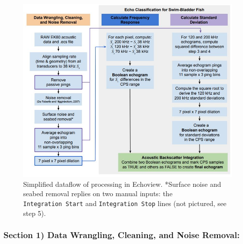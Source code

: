 \documentclass[
  letterpaper,
  oneside,
  open=any]{scrbook}
\begin{document}
\begin{figure}[H]

{\centering \includegraphics{content/images/ev-processing.JPG}

}

\caption{Simplified dataflow of processing in Echoview. *Surface noise
and seabed removal replies on two manual inputs: the
\texttt{Integration\ Start} and \texttt{Integration\ Stop} lines (not
pictured, see step 5).}

\end{figure}%

\subsubsection{\texorpdfstring{\textbf{Section 1) Data Wrangling,
Cleaning, and Noise
Removal:}}{Section 1) Data Wrangling, Cleaning, and Noise Removal:}}\label{section-1-data-wrangling-cleaning-and-noise-removal}
\end{document}
